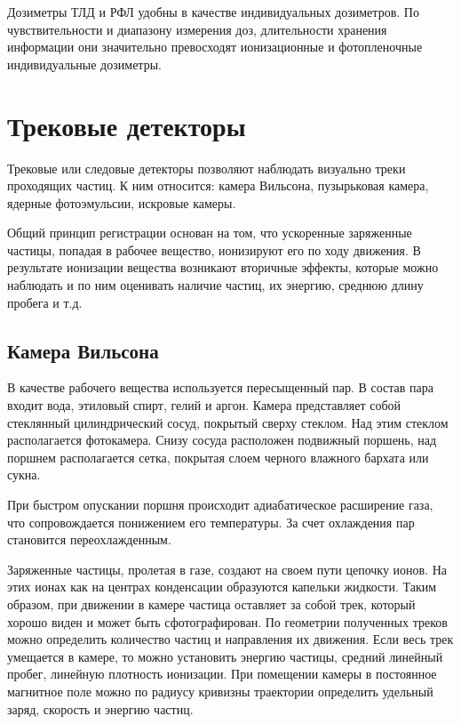 \documentclass[14pt,pscyr,titlepage]{hedreport}
\begin{document}
		Дозиметры ТЛД и РФЛ удобны в качестве индивидуальных дозиметров. 
		По чувствительности и диапазону измерения доз, длительности хранения 
		информации они значительно превосходят ионизационные и фотопленочные 
		индивидуальные дозиметры. 

	\pagebreak

	\section{Трековые детекторы}
		Трековые или следовые детекторы позволяют наблюдать визуально треки 
		проходящих частиц. К ним относится: камера Вильсона, пузырьковая 
		камера, ядерные фотоэмульсии, искровые камеры.

		Общий принцип регистрации основан на том, что ускоренные заряженные 
		частицы, попадая в рабочее вещество, ионизируют его по ходу движения. 
		В результате ионизации вещества возникают вторичные эффекты, которые 
		можно наблюдать и по ним оценивать наличие частиц, их энергию, 
		среднюю длину пробега и т.д.

	\subsection{Камера Вильсона}
		В качестве рабочего вещества используется пересыщенный пар. В состав 
		пара входит вода, этиловый спирт, гелий и аргон.  Камера представляет 
		собой стеклянный цилиндрический сосуд, покрытый сверху стеклом. Над 
		этим стеклом располагается фотокамера. Снизу сосуда 
		расположен подвижный поршень, над поршнем располагается сетка, 
		покрытая слоем черного влажного бархата или сукна.

		При быстром опускании поршня происходит адиабатическое расширение 
		газа, что сопровождается понижением его температуры. За счет 
		охлаждения пар становится переохлажденным. 

		Заряженные частицы, пролетая в газе, создают на своем пути цепочку 
		ионов. На этих ионах как на центрах конденсации образуются капельки 
		жидкости. Таким образом, при движении в камере частица оставляет за 
		собой трек, который хорошо виден и может быть сфотографирован. По 
		геометрии полученных треков можно определить количество частиц и 
		направления их движения. Если весь трек умещается в камере, то можно 
		установить энергию частицы, средний линейный пробег, линейную 
		плотность ионизации. При помещении камеры в постоянное магнитное 
		поле можно по радиусу кривизны траектории определить удельный заряд, 
		скорость и энергию частиц.
\end{document}
